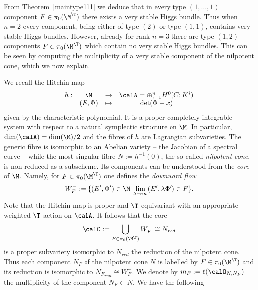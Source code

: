 From Theorem~\ref{maintype111} we  deduce that in every type $(1,\dots,1)$ component $F\in\pi_0(\M^\T)$ there exists a very stable Higgs bundle. Thus  when $n=2$ every component, being either of type $(2)$ or type $(1,1)$, contains very stable Higgs bundles. However, already for rank $n=3$ there are type $(1,2)$ components $F\in\pi_0(\M^\T)$ which contain no very stable Higgs bundles. This can be seen by computing the multiplicity of a very stable component of the nilpotent cone, which we now explain.

We recall the Hitchin map \cite{hitchin-stable} $$\begin{array}{cccc} h:&\M&\to &\calA=\oplus_{i=1}^n  H^0(C;K^i)\\ &(E,\Phi)&\mapsto & \det(\Phi-x)\end{array} $$ given by the characteristic polynomial. It is a proper completely integrable system \cite{nitsure,hitchin-stable} with respect to a natural symplectic structure on $\M$. In particular, $\dim(\calA)=\dim(\M)/2$ and the fibres of $h$ are Lagrangian subvarieties. The generic fibre is isomorphic to an Abelian variety -- the Jacobian of a  spectral curve -- while the most singular fibre $N:=h^{-1}(0)$, the so-called {\em nilpotent cone}, is non-reduced as a subscheme. Its components can be understood from the {\em core} of $\M$. Namely, for  $F\in {\pi_0(\M^\T)}$  one defines the {\em downward flow} $$ W^-_F:=\{(E^\prime,\Phi^\prime)\in \M | \lim_{\lambda \to \infty} (E^\prime,\lambda\Phi^\prime)\in F\}.$$ Note that the Hitchin map is proper and $\T$-equivariant with an appropriate weighted $\T$-action on $\calA$. It follows that the  core  $$\calC:=\bigcup_{F\in \pi_0(\M^\T)}W^-_F\cong N_{red}$$ is a proper subvariety isomorphic to $N_{red}$ the reduction of the nilpotent cone. Thus each component $N_F$ of the nilpotent cone $N$ is labelled by $F\in \pi_0(\M^{\T})$ and its reduction is isomorphic to ${N_F}_{red}\cong\overline{W^-_F}$. We denote by $m_F:=\ell(\calO_{N,N_F})$ the multiplicity of the component $N_F\subset N$. We have the following


